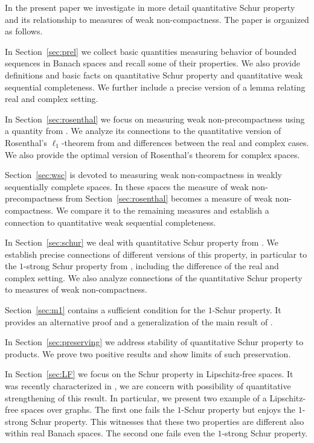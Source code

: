 \documentclass{amsart}
\numberwithin{equation}{section}
\theoremstyle{definition}
\begin{document}
In the present paper we investigate in more detail quantitative Schur property and its relationship to measures of weak non-compactness. The paper is organized as follows.

In Section~\ref{sec:prel} we collect basic quantities measuring behavior of bounded sequences in Banach spaces
and recall some of their properties. We also provide definitions and basic facts on quantitative Schur property and quantitative weak sequential completeness. We further include a precise version of a lemma relating real and complex setting.

In Section~\ref{sec:rosenthal} we focus on measuring weak non-precompactness using a quantity from \cite{kania-qgp}. We analyze its connections to the quantitative version of Rosenthal's $\ell_1$-theorem from \cite{behrends} and differences between the real and complex cases. We also provide the optimal version of Rosenthal's theorem for complex spaces.

Section~\ref{sec:wsc} is devoted to measuring weak non-compactness in weakly sequentially complete spaces. In these spaces the measure of weak non-precompactness from Section~\ref{sec:rosenthal} becomes a measure of weak non-compactness. We compare it to the remaining measures and establish a connection to quantitative weak sequential completeness.

In Section~\ref{sec:schur} we deal with quantitative Schur property from \cite{qschur}. We establish precise connections of different versions of this property, in particular to the $1$-strong Schur property from \cite{Go-Ka-Li}, including the difference of the real and complex setting. We also analyze connections of the quantitative Schur property to measures of weak non-compactness.

Section~\ref{sec:m1} contains a sufficient condition for the $1$-Schur property. It provides an alternative
proof and a generalization of the main result of \cite{qschur-dp}.

In Section~\ref{sec:preserving} we address stability of quantitative Schur property to products. We prove two
positive results and show limits of such preservation. 


In Section~\ref{sec:LF} we focus on the Schur property in Lipschitz-free spaces. It was recently characterized in \cite{p1u}, we are concern with possibility of quantitative strengthening of this result. In particular, we present two example of a Lipschitz-free spaces over graphs. The first one fails the $1$-Schur property but enjoys the $1$-strong Schur property. This witnesses that these two properties are different also within real Banach spaces. The second one fails even the $1$-strong Schur property. 
\end{document}

